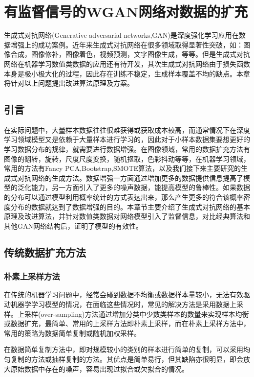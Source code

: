 \chapter{有监督信号的WGAN网络对数据的扩充}
生成式对抗网络(Generative adversarial networks,GAN)\cite{Goodfellow2017NIPS}是深度强化学习应用在数据增强上的成功案例。近年来生成式对抗网络在很多领域取得显著性突破，如：图像合成，图像修补，图像着色，视频预测，文字图像生成，等等。但是生成式对抗网络在机器学习数值类数据的应用还有待开发，其次生成式对抗网络由于损失函数本身是极小极大化的过程，因此存在训练不稳定，生成样本覆盖不均的缺点。本章将针对以上问题提出改进算法原理及方案。
\section{引言}
在实际问题中，大量样本数据往往很难获得或获取成本较高，而通常情况下在深度学习领域模型又是依赖于大量样本进行学习的，因此对于小样本数据集要想更好的学习数据分布的规律，就需要进行数据增强。在图像领域，常用的数据扩充方法有图像的翻转，旋转，尺度尺度变换，随机抠取，色彩抖动等等，在机器学习领域，常用的方法有Fancy PCA\cite{Holdt2010Genome},Bootstrap,SMOTE算法，以及我们接下来主要研究的生成式对抗网络的生成方法。数据增强一方面通过增加更多的数据提供信息提高了模型的泛化能力，另一方面引入了更多的噪声数据，能提高模型的鲁棒性。如果数据的分布可以通过模型利用概率统计的方式表达出来，那么产生更多的符合该概率密度分布的数据就达到了数据增强的目的。本章节主要介绍了生成式对抗网络的基本原理及改进算法，并针对数值类数据对网络模型引入了监督信息，对比经典算法和其他GAN网络结构后，证明了模型的有效性。
\section{传统数据扩充方法}
\subsection{朴素上采样方法}
在传统的机器学习问题中，经常会碰到数据不均衡或数据样本量较小，无法有效驱动机器学学习模型的情况，在面临这些情况时，常见的解决方法是采用数据上采样。上采样(over-sampling)方法通过增加分类中少数类样本的数量来实现样本均衡或数据扩充，最简单、常用的上采样方法即朴素上采样，而在朴素上采样方法中，常用的策略为数据简单复制或随机加权采样。

在数据简单复制方法中，即对规模较小的类别的样本进行简单的复制，可以采用均匀复制的方法或抽样复制的方法。其优点是简单易行，但其缺陷亦很明显，即会放大原始数据中存在的噪声，容易出现过拟合或欠拟合的情况。


